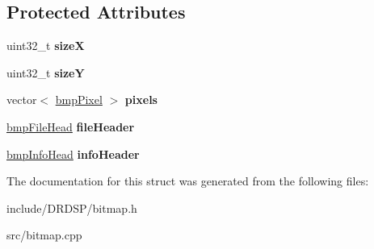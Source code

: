 \subsection*{Protected Attributes}
\begin{DoxyCompactItemize}
\item 
\hypertarget{struct_d_r_d_s_p_1_1_bitmap_a7e53b594b6c1abc0798c7be098308ba0}{uint32\-\_\-t {\bfseries size\-X}}\label{struct_d_r_d_s_p_1_1_bitmap_a7e53b594b6c1abc0798c7be098308ba0}

\item 
\hypertarget{struct_d_r_d_s_p_1_1_bitmap_a358a6e8780eab579c2a3e3abda5db0fa}{uint32\-\_\-t {\bfseries size\-Y}}\label{struct_d_r_d_s_p_1_1_bitmap_a358a6e8780eab579c2a3e3abda5db0fa}

\item 
\hypertarget{struct_d_r_d_s_p_1_1_bitmap_a02b0456066521235f9960d0b65ecf654}{vector$<$ \hyperlink{struct_d_r_d_s_p_1_1bmp_pixel}{bmp\-Pixel} $>$ {\bfseries pixels}}\label{struct_d_r_d_s_p_1_1_bitmap_a02b0456066521235f9960d0b65ecf654}

\item 
\hypertarget{struct_d_r_d_s_p_1_1_bitmap_a9fbbb0b1e74b7eb3eeda49b1c8591a67}{\hyperlink{struct_d_r_d_s_p_1_1bmp_file_head}{bmp\-File\-Head} {\bfseries file\-Header}}\label{struct_d_r_d_s_p_1_1_bitmap_a9fbbb0b1e74b7eb3eeda49b1c8591a67}

\item 
\hypertarget{struct_d_r_d_s_p_1_1_bitmap_a64fdaeeb92f36229904a34b63cefb56d}{\hyperlink{struct_d_r_d_s_p_1_1bmp_info_head}{bmp\-Info\-Head} {\bfseries info\-Header}}\label{struct_d_r_d_s_p_1_1_bitmap_a64fdaeeb92f36229904a34b63cefb56d}

\end{DoxyCompactItemize}


The documentation for this struct was generated from the following files\-:\begin{DoxyCompactItemize}
\item 
include/\-D\-R\-D\-S\-P/bitmap.\-h\item 
src/bitmap.\-cpp\end{DoxyCompactItemize}
